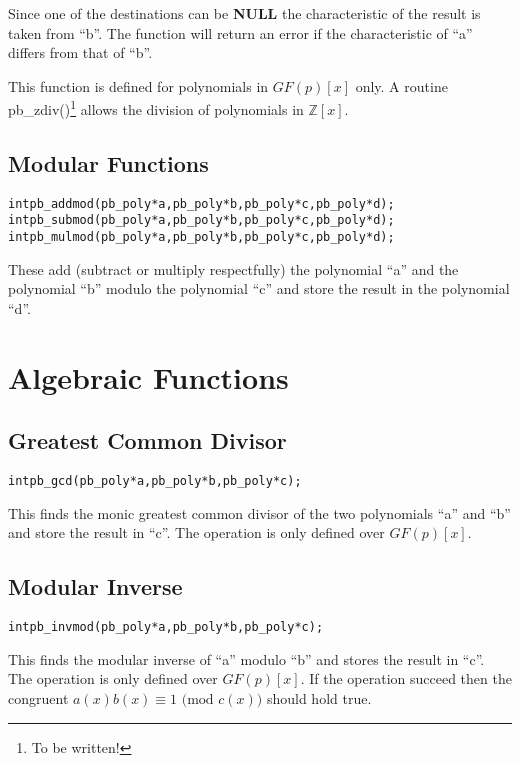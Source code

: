 \documentclass[b5paper]{book}
\def\Z{{\mathbb Z}}
\begin{document}
Since one of the destinations can be \textbf{NULL} the characteristic of the result is taken from ``b''.  The function
will return an error if the characteristic of ``a'' differs from that of ``b''.  

This function is defined for polynomials in $GF(p)[x]$ only.  A routine pb\_zdiv()\footnote{To be written!} allows the 
division of polynomials in $\Z[x]$.  

\section{Modular Functions}
  
\begin{alltt}
int pb_addmod(pb_poly *a, pb_poly *b, pb_poly *c, pb_poly *d);
int pb_submod(pb_poly *a, pb_poly *b, pb_poly *c, pb_poly *d);
int pb_mulmod(pb_poly *a, pb_poly *b, pb_poly *c, pb_poly *d);
\end{alltt}

These add (subtract or multiply respectfully) the polynomial ``a'' and the polynomial ``b'' modulo the polynomial ``c''
and store the result in the polynomial ``d''.  

\chapter{Algebraic Functions}
\section{Greatest Common Divisor}
\begin{alltt}
int pb_gcd(pb_poly *a, pb_poly *b, pb_poly *c);
\end{alltt}
This finds the monic greatest common divisor of the two polynomials ``a'' and ``b'' and store the result in ``c''.  The
operation is only defined over $GF(p)[x]$.  

\section{Modular Inverse}
\begin{alltt}
int pb_invmod(pb_poly *a, pb_poly *b, pb_poly *c);
\end{alltt}
This finds the modular inverse of ``a'' modulo ``b'' and stores the result in ``c''.  The operation is only defined over 
$GF(p)[x]$.  If the operation succeed then the congruent $a(x)b(x) \equiv 1 \mbox{ (mod }c(x)\mbox{)}$ should hold true.


\end{document}
